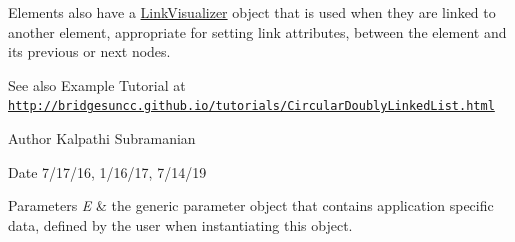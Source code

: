 Elements also have a \hyperlink{classbridges_1_1base_1_1_link_visualizer}{Link\+Visualizer} object that is used when they are linked to another element, appropriate for setting link attributes, between the element and its previous or next nodes.

\begin{DoxySeeAlso}{See also}
Example Tutorial at \href{http://bridgesuncc.github.io/tutorials/CircularDoublyLinkedList.html}{\tt http\+://bridgesuncc.\+github.\+io/tutorials/\+Circular\+Doubly\+Linked\+List.\+html}
\end{DoxySeeAlso}
\begin{DoxyAuthor}{Author}
Kalpathi Subramanian
\end{DoxyAuthor}
\begin{DoxyDate}{Date}
7/17/16, 1/16/17, 7/14/19
\end{DoxyDate}

\begin{DoxyParams}{Parameters}
{\em E} & the generic parameter object that contains application specific data, defined by the user when instantiating this object. \\
\hline
\end{DoxyParams}
